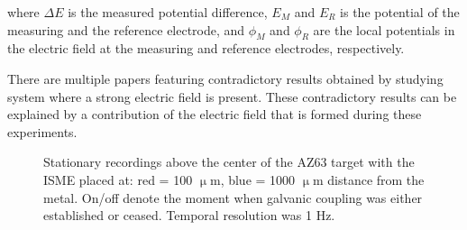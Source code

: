 where $\Delta E$ is the measured potential difference, $E_M$ and $E_R$ is the potential of the measuring and the reference electrode, and $\phi_M$ and $\phi_R$ are the local potentials in the electric field at the measuring and reference electrodes, respectively.

There are multiple papers featuring contradictory results obtained by studying system where a strong electric field is present. These contradictory results can be explained by a contribution of the electric field that is formed during these experiments. 

\begin{figure}
\centering
{}
\caption{Stationary recordings above the center of the AZ63 target with the ISME placed at: red = 100 $\upmu$m, blue = 1000 $\upmu$m distance from the metal. On/off denote the moment when galvanic coupling was either established or ceased. Temporal resolution was 1 Hz.}
\label{fig:approach}
\end{figure}

